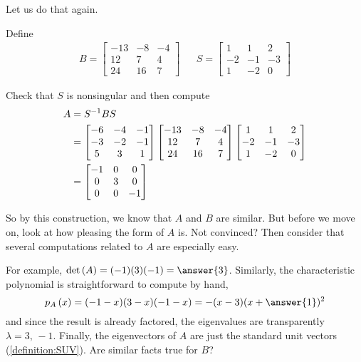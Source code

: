 \documentclass{ximera}
\begin{document}
Let us do that again.

\begin{example}
  Define
  \begin{align*}
    B=\begin{bmatrix}
      -13 & -8 & -4 \\
      12 & 7 & 4 \\
      24 & 16 & 7
    \end{bmatrix}
         &&
            S=\begin{bmatrix}
              1 & 1 & 2 \\
              -2 & -1 & -3 \\
              1 & -2 & 0
            \end{bmatrix}
  \end{align*}
  
  
  Check that $S$ is nonsingular and then compute
  \begin{align*}
    A&=S^{-1}BS\\
     &=
       \begin{bmatrix}
         -6 & -4 & -1 \\
         -3 & -2 & -1 \\
         5 & 3 & 1
       \end{bmatrix}
                 \begin{bmatrix}
                   -13 & -8 & -4 \\
                   12 & 7 & 4 \\
                   24 & 16 & 7
                 \end{bmatrix}
                             \begin{bmatrix}
                               1 & 1 & 2 \\
                               -2 & -1 & -3 \\
                               1 & -2 & 0
                             \end{bmatrix}\\
     &=
       \begin{bmatrix}
         -1 & 0 & 0 \\
         0 & 3 & 0 \\
         0 & 0 & -1
       \end{bmatrix}
  \end{align*}
  
  So by this construction, we know that $A$ and $B$ are similar.  But
  before we move on, look at how pleasing the form of $A$ is.  Not
  convinced?  Then consider that several computations related to $A$
  are especially easy.
  
  For example,
  $\detname{A}=(-1)(3)(-1)=\answer{3}$.
  Similarly, the characteristic polynomial
  is straightforward to compute by hand,
  \[
    \charpoly{A}{x}=(-1-x)(3-x)(-1-x)=-(x-3)(x+\answer{1})^2
  \]
  and since the result is already factored, the eigenvalues are
  transparently $\lambda=3,\,-1$.  Finally, the eigenvectors of $A$ are
  just the standard unit vectors (\ref{definition:SUV}).  Are similar facts true for $B$?
\end{example}
\end{document}
